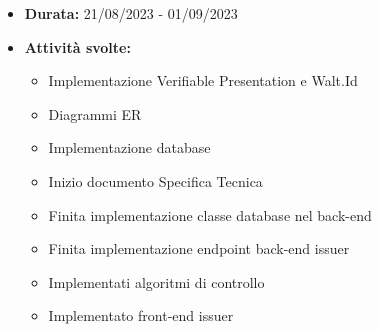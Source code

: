         \begin{itemize}
            \item \textbf{Durata:} 21/08/2023 - 01/09/2023 
            \item \textbf{Attività svolte:}
            \begin{itemize}
                \item Implementazione Verifiable Presentation e Walt.Id
                \item Diagrammi ER
                \item Implementazione database
                \item Inizio documento Specifica Tecnica
                \item Finita implementazione classe database nel back-end
                \item Finita implementazione endpoint back-end issuer
                \item Implementati algoritmi di controllo
                \item Implementato front-end issuer
                

\end{itemize}
\end{itemize}
